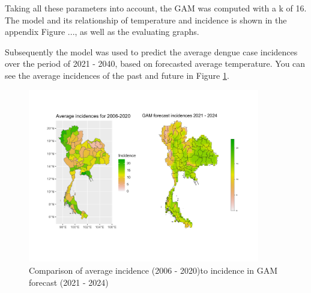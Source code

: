 Taking all these parameters into account, the GAM was computed with a k of 16. The model and its relationship of temperature and incidence is shown in the appendix Figure ..., as well as the evaluating graphs.

Subsequently the model was used to predict the average dengue case incidences over the period of 2021 - 2040, based on forecasted average temperature. You can see the average incidences of the past and future in Figure \ref{fig:gamvsimap}.

\begin{figure}[hbpt]
	
	\includegraphics[width=0.9\textwidth]{fig/gam_vs_i.jpg}
	\caption{Comparison of average incidence (2006 - 2020)to incidence in GAM forecast (2021 - 2024)}
	\label{fig:gamvsimap}
	
\end{figure}
